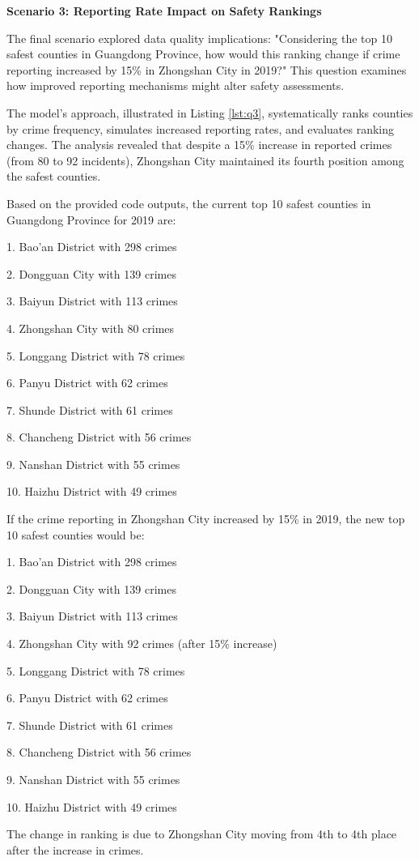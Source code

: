 \noindent \textbf{Scenario 3: Reporting Rate Impact on Safety Rankings}

The final scenario explored data quality implications: "Considering the top 10 safest counties in Guangdong Province, how would this ranking change if crime reporting increased by 15\% in Zhongshan City in 2019?" This question examines how improved reporting mechanisms might alter safety assessments.

The model's approach, illustrated in Listing \ref{lst:q3}, systematically ranks counties by crime frequency, simulates increased reporting rates, and evaluates ranking changes. The analysis revealed that despite a 15\% increase in reported crimes (from 80 to 92 incidents), Zhongshan City maintained its fourth position among the safest counties.



\begin{tcolorbox}[colback=white!95!black, colframe=black, title=Q3 Response, fontupper=\scriptsize, boxsep=2pt, left=3pt, right=3pt]
  Based on the provided code outputs, the current top 10 safest counties in Guangdong Province for 2019 are:

  1. Bao'an District with 298 crimes

  2. Dongguan City with 139 crimes
  
  3. Baiyun District with 113 crimes
  
  4. Zhongshan City with 80 crimes
  
  5. Longgang District with 78 crimes
  
  6. Panyu District with 62 crimes
  
  7. Shunde District with 61 crimes
  
  8. Chancheng District with 56 crimes
  
  9. Nanshan District with 55 crimes
  
  10. Haizhu District with 49 crimes

  If the crime reporting in Zhongshan City increased by 15\% in 2019, the new top 10 safest counties would be:

  1. Bao'an District with 298 crimes

  2. Dongguan City with 139 crimes

  3. Baiyun District with 113 crimes

  4. Zhongshan City with 92 crimes (after 15\% increase)

  5. Longgang District with 78 crimes

  6. Panyu District with 62 crimes

  7. Shunde District with 61 crimes

  8. Chancheng District with 56 crimes

  9. Nanshan District with 55 crimes

  10. Haizhu District with 49 crimes

  The change in ranking is due to Zhongshan City moving from 4th to 4th place after the increase in crimes.
\end{tcolorbox}


